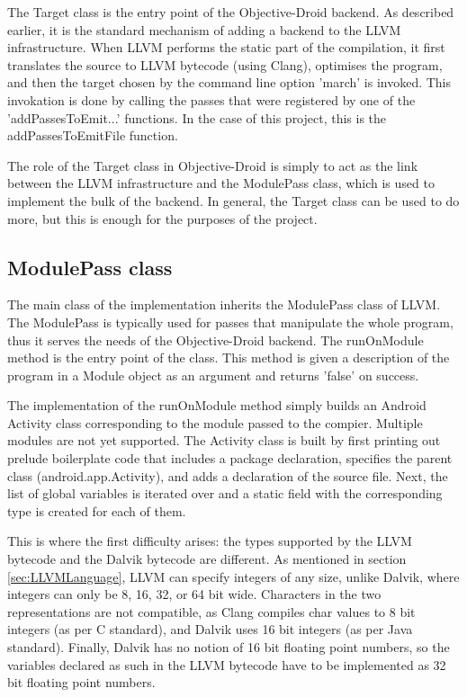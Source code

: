 \documentclass[parskip]{cs4rep}
\begin{document}
The Target class is the entry point of the Objective-Droid backend. As described earlier, it is the standard mechanism of adding a backend to the LLVM infrastructure. When LLVM performs the static part of the compilation, it first translates the source to LLVM bytecode (using Clang), optimises the program, and then the target chosen by the command line option 'march' is invoked. This invokation is done by calling the passes that were registered by one of the 'addPassesToEmit...' functions. In the case of this project, this is the addPassesToEmitFile function.

The role of the Target class in Objective-Droid is simply to act as the link between the LLVM infrastructure and the ModulePass class, which is used to implement the bulk of the backend. In general, the Target class can be used to do more, but this is enough for the purposes of the project.

\subsection{ModulePass class} \label{sec:ModulePassClass}

The main class of the implementation inherits the ModulePass class of LLVM. The ModulePass is typically used for passes that manipulate the whole program, thus it serves the needs of the Objective-Droid backend. The runOnModule method is the entry point of the class. This method is given a description of the program in a Module object as an argument and returns 'false' on success.

The implementation of the runOnModule method simply builds an Android Activity class corresponding to the module passed to the compier. Multiple modules are not yet supported. The Activity class is built by first printing out prelude boilerplate code that includes a package declaration, specifies the parent class (android.app.Activity), and adds a declaration of the source file. Next, the list of global variables is iterated over and a static field with the corresponding type is created for each of them. 

This is where the first difficulty arises: the types supported by the LLVM bytecode and the Dalvik bytecode are different. As mentioned in section \ref{sec:LLVMLanguage}, LLVM can specify integers of any size, unlike Dalvik, where integers can only be 8, 16, 32, or 64 bit wide. Characters in the two representations are not compatible, as Clang compiles char values to 8 bit integers (as per C standard), and Dalvik uses 16 bit integers (as per Java standard). Finally, Dalvik has no notion of 16 bit floating point numbers, so the variables declared as such in the LLVM bytecode have to be implemented as 32 bit floating point numbers.
\end{document}
